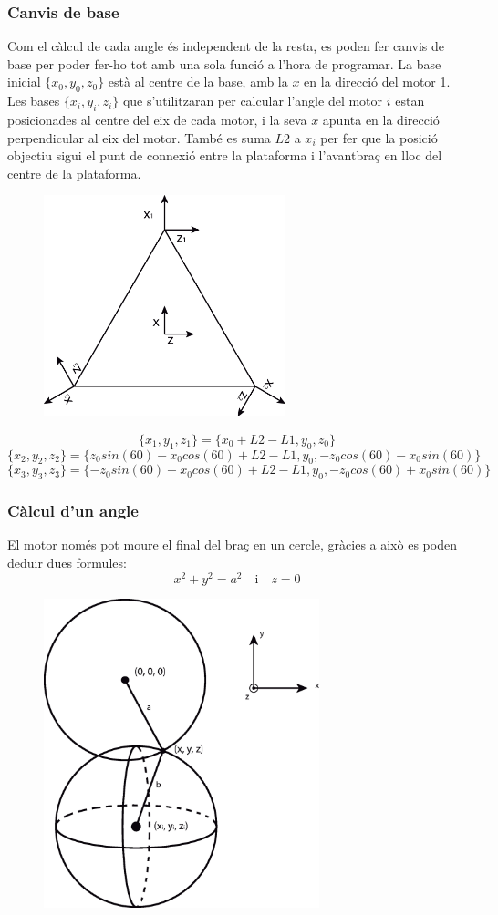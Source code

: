 \subsubsection{Canvis de base}
Com el càlcul de cada angle és independent de la resta, es poden fer canvis de base per poder fer-ho tot amb una sola funció a l'hora de programar. La base inicial $\{x_0,y_0,z_0\}$ està al centre de la base, amb la $x$ en la direcció del motor 1. Les bases $\{x_i,y_i,z_i\}$ que s'utilitzaran per calcular l'angle del motor $i$ estan posicionades al centre del eix de cada motor, i la seva $x$ apunta en la direcció perpendicular al eix del motor. També es suma $L2$ a $x_i$ per fer que la posició objectiu sigui el punt de connexió entre la plataforma i l'avantbraç en lloc del centre de la plataforma.

\begin{figure}[h!]
\centering
\includegraphics[width=7cm]{./sketch/canvi_base}
\end{figure}

$$\{x_1,y_1,z_1\}=\{x_0+L2-L1,y_0,z_0\}$$
$$\{x_2,y_2,z_2\}=\{z_0sin(60)-x_0cos(60)+L2-L1,y_0,-z_0cos(60)-x_0sin(60)\}$$
$$\{x_3,y_3,z_3\}=\{-z_0sin(60)-x_0cos(60)+L2-L1,y_0,-z_0cos(60)+x_0sin(60)\}$$

\subsubsection{Càlcul d'un angle}

El motor només pot moure el final del braç en un cercle, gràcies a això es poden deduir dues formules:$$x^2+y^2=a^2 \quad \textrm{i} \quad z=0$$

\begin{figure}[h!]
\centering
\includegraphics[width=8cm]{./sketch/calcul_angle}
\end{figure}

